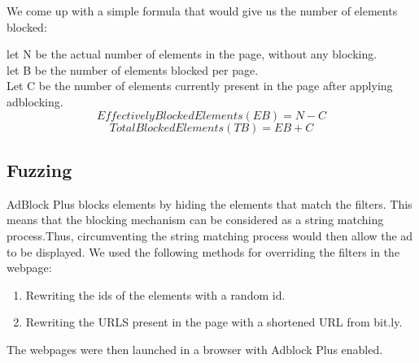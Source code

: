 We come up with a simple formula that would give us the number of elements blocked:

let N be the actual number of elements  in the page, without any blocking. \\
let B be the number of elements blocked per page.\\
Let C be the  number of elements currently present in the page after applying adblocking. \\
\begin{equation}
Effectively Blocked Elements (EB) = N - C
\end{equation}
\begin{equation}
 Total Blocked Elements (TB) = EB + C
\end{equation}
\subsection{Fuzzing}
AdBlock Plus blocks elements by hiding the elements that match the filters. This means that the blocking mechanism can be considered as a string matching process.Thus, circumventing the string matching process would then allow the ad to be displayed. We used the following methods for overriding the filters in the webpage:
\begin{enumerate}
  \item  Rewriting the ids of the elements with a random id.
  \item  Rewriting the URLS present in the page  with a shortened URL from bit.ly.
\end{enumerate}
 The webpages were then launched in a browser with Adblock Plus enabled.









